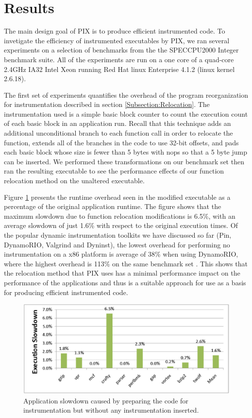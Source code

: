 \section{Results}

The main design goal of PIX is to produce efficient instrumented code. 
To invetigate the efficiency of instrumented executables by PIX, we ran several experiments 
on a selection of benchmarks from the the SPECCPU2000
Integer benchmark suite. All of the experiments are run on a
one core of a quad-core 2.4GHz IA32 Intel Xeon running Red Hat linux Enterprise 4.1.2 (linux kernel 2.6.18).

The first set of experiments quantifies the overhead of the program reorganization for instrumentation 
described in section \ref{Subsection:Relocation}. The instrumentation used is a simple basic block counter to count
the execution count of each basic block in an application run. Recall that this technique adds an additional unconditional
branch to each function call in order to relocate the function, extends all of the branches in the code
to use 32-bit offsets, and pads each basic block whose size is fewer than 5 bytes with nops so that a
5 byte jump can be inserted. We performed these transformations on our benchmark set then ran the resulting executable
to see the performance effects of our function relocation method on the unaltered executable. 

Figure \ref{Figure:RelocOverhead} presents
the runtime overhead seen in the modified executable as a percentage of the original application runtime.
The figure shows that the maximum slowdown due to function relocation modifications is 6.5\%, with an
average slowdown of just 1.6\% with respect to the original execution times. Of the popular dynamic instrumentation toolkits 
we have discussed so far (Pin, DynamoRIO, Valgrind and Dyninst), the lowest overhead for performing no instrumentation
on a x86 platform is average of 38\% when using DynamoRIO, where the highest overhead is 113\% on the same benchmark
set \cite{luk2005pin}. This shows that the relocation method that PIX uses has a minimal
performance impact on the performance of the applications and thus is a suitable approach for use as a basis for
producing efficient instrumented code.

\begin{figure}[ht]
\centering
\label{Figure:RelocOverhead}
\includegraphics[scale=0.6]{relocperf.eps}
\caption{Application slowdown caused by preparing the code for instrumentation but without
any instrumentation inserted.}
\end{figure}

